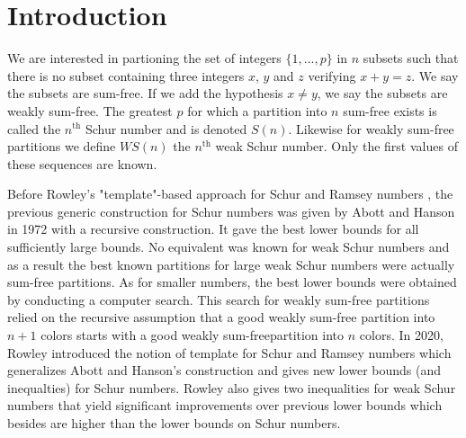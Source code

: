 \section{Introduction}

We are interested in partioning the set of integers \(\{1, ..., p\}\) in \(n\) subsets such that there is no subset 
containing three integers \(x\), \(y\) and \(z\) verifying \(x + y = z\). We say the subsets are sum-free. If we 
add the hypothesis \(x \neq y\), we say the subsets are weakly sum-free. The greatest \(p\) for which a 
partition into \(n\) sum-free exists is called the \(n^{\text{th}}\) Schur number and is denoted \(S(n)\). 
\cite{Schur1917} Likewise for weakly sum-free partitions we define \(WS(n)\) the \(n^{\text{th}}\) weak Schur 
number. \cite{Irving1973} Only the first values of these sequences are known.

\par Before Rowley's "template"-based approach for Schur and Ramsey numbers \cite{RowleyRamsey}, the 
previous generic construction for Schur numbers was given by Abott and Hanson \cite{AbottHanson} in 1972 
with a recursive construction. It gave the best lower bounds for all sufficiently large bounds. No equivalent 
was known for weak Schur numbers and as a result the best known partitions for large weak Schur numbers 
were actually sum-free partitions. As for smaller numbers, the best lower bounds were obtained by conducting 
a computer search. This search for weakly sum-free partitions relied on the recursive assumption that a good 
weakly sum-free partition into \(n+1\) colors starts with a good weakly sum-freepartition into \(n\) colors. In 
2020, Rowley introduced the notion of template for Schur and Ramsey numbers which generalizes Abott and 
Hanson's construction and gives new lower bounds (and inequalties) for Schur numbers. Rowley also gives two 
inequalities for weak Schur numbers that yield significant improvements over previous lower bounds which 
besides are higher than the lower bounds on Schur numbers. \cite{RowleyWS}

\renewcommand{\arraystretch}{1.5}
\setlength{\tabcolsep}{2pt}

